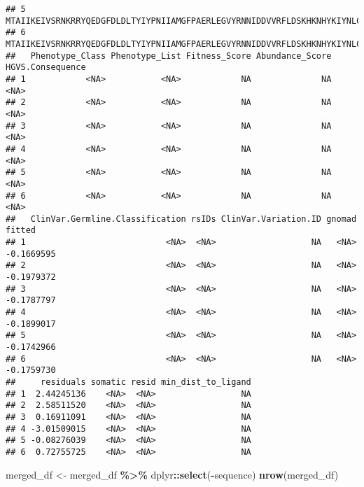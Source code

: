 \documentclass[
]{article}
\newenvironment{Shaded}{\begin{snugshade}}{\end{snugshade}}
\newcommand{\FunctionTok}[1]{\textcolor[rgb]{0.13,0.29,0.53}{\textbf{#1}}}
\newcommand{\NormalTok}[1]{#1}
\newcommand{\OtherTok}[1]{\textcolor[rgb]{0.56,0.35,0.01}{#1}}
\newcommand{\SpecialCharTok}[1]{\textcolor[rgb]{0.81,0.36,0.00}{\textbf{#1}}}
\begin{document}
\begin{verbatim}
## 5 MTAIIKEIVSRNKRRYQEDGFDLDLTYIYPNIIAMGFPAERLEGVYRNNIDDVVRFLDSKHKNHYKIYNLCAERHYDTAKFNCRVAQYPFEDHNPPQLELIKPFCEDLDQWLSEDDNHVAAIHCKAGKGRTGVMICAYLLHRGKFLKAQEALDFYGEVRTRDKKGVTIPSQRRYVYYYSYLLKNHLDYRPVALLFHKMMFETIPMFSGGTCNPQFVVCQLKVKIYSSNSGPTRREDKFMYFEFPQPLPVCGDIKVEFFHKQNKMLKKDKMFHFWVNTFFIPGPEETSEKVENGSLCDQEIDSICSIERADNDKEYLVLTLTKNDLDKANKDKANRYFSPNFKVKLYFTKTVEEPSNPEASSSTSVTPDVSDNEPDHYRYSDTTDSDPENEPFDEDQHTQITKV
## 6 MTAIIKEIVSRNKRRYQEDGFDLDLTYIYPNIIAMGFPAERLEGVYRNNIDDVVRFLDSKHKNHYKIYNLCAERHYDTAKFNCRVAQYPFEDHNPPQLELIKPFCEDLDQWLSEDDNHVAAIHCKAGKGRTGVMICAYLLHRGKFLKAQEALDFYGEVRTRDKKGVTIPSQRRYVYYYSYLLKNHLDYRPVALLFHKMMFETIPMFSGGTCNPQFVVCQLKVKIYSSNSGPTRREDKFMYFEFPQPLPVCGDIKVEFFHKQNKMLKKDKMFHFWVNTFFIPGPEETSEKVENGSLCDQEIDSICSIERADNDKEYLVLTLTKNDLDKANKDKANRYFSPNFKVKLYFTKTVEEPSNPEASSSTSVTPDVSDNEPDHYRYSDTTDSDPENEPFDEDQHTQITKV
##   Phenotype_Class Phenotype_List Fitness_Score Abundance_Score HGVS.Consequence
## 1            <NA>           <NA>            NA              NA             <NA>
## 2            <NA>           <NA>            NA              NA             <NA>
## 3            <NA>           <NA>            NA              NA             <NA>
## 4            <NA>           <NA>            NA              NA             <NA>
## 5            <NA>           <NA>            NA              NA             <NA>
## 6            <NA>           <NA>            NA              NA             <NA>
##   ClinVar.Germline.Classification rsIDs ClinVar.Variation.ID gnomad     fitted
## 1                            <NA>  <NA>                   NA   <NA> -0.1669595
## 2                            <NA>  <NA>                   NA   <NA> -0.1979372
## 3                            <NA>  <NA>                   NA   <NA> -0.1787797
## 4                            <NA>  <NA>                   NA   <NA> -0.1899017
## 5                            <NA>  <NA>                   NA   <NA> -0.1742966
## 6                            <NA>  <NA>                   NA   <NA> -0.1759730
##     residuals somatic resid min_dist_to_ligand
## 1  2.44245136    <NA>  <NA>                 NA
## 2  2.58511520    <NA>  <NA>                 NA
## 3  0.16911091    <NA>  <NA>                 NA
## 4 -3.01509015    <NA>  <NA>                 NA
## 5 -0.08276039    <NA>  <NA>                 NA
## 6  0.72755725    <NA>  <NA>                 NA
\end{verbatim}

\begin{Shaded}
\begin{Highlighting}[]
\NormalTok{merged\_df }\OtherTok{\textless{}{-}}\NormalTok{ merged\_df }\SpecialCharTok{\%\textgreater{}\%}\NormalTok{ dplyr}\SpecialCharTok{::}\FunctionTok{select}\NormalTok{(}\SpecialCharTok{{-}}\NormalTok{sequence)}
\FunctionTok{nrow}\NormalTok{(merged\_df)}
\end{Highlighting}
\end{Shaded}
\end{document}
